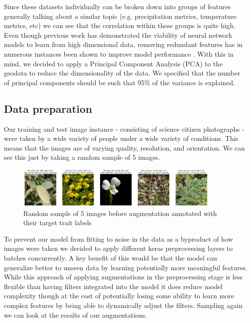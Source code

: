 \documentclass[12pt,a4paper,oneside]{article}
\begin{document}
Since these datasets individually can be broken down into groups of features generally talking about a similar topic (e.g. precipitation metrics, temperature metrics, etc) we can see that the correlation within these groups is quite high. Even though previous work \cite{DBLP:journals/corr/abs-2007-00062} has demonstrated the viability of neural network models to learn from high dimensional data, removing redundant features has in numerous instances been shown to improve model performance \cite{chen2022survey}. With this in mind, we decided to apply a Principal Component Analysis (PCA) to the geodata to reduce the dimensionality of the data. We specified that the number of principal components should be such that 95\% of the variance is explained.  

\subsection{Data preparation}

Our training and test image instance - consisting of science citizen photographs - were taken by a wide variety of people under a wide variety of conditions. This means that the images are of varying quality, resolution, and orientation. We can see this just by taking a random sample of 5 images.
\begin{figure}[!h]
    \centering
    \includegraphics[width=0.9\textwidth]{assets/before_aug_img.png}
    \caption{Random sample of 5 images before augmentation annotated with their target trait labels}
\end{figure}

To prevent our model from fitting to noise in the data as a byproduct of how images were taken we decided to apply different keras preprocessing layers to batches concurrently. A key benefit of this would be that the model can generalize better to unseen data by learning potentially more meaningful features. While this approach of applying augmentations in the preprocessing stage is less flexible than having filters integrated into the model it does reduce model complexity though at the cost of potentially losing some ability to learn more complex features by being able to dynamically adjust the filters. Sampling again we can look at the results of our augmentations. 
\end{document}
